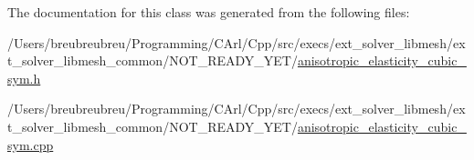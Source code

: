 The documentation for this class was generated from the following files\+:\begin{DoxyCompactItemize}
\item 
/\+Users/breubreubreu/\+Programming/\+C\+Arl/\+Cpp/src/execs/ext\+\_\+solver\+\_\+libmesh/ext\+\_\+solver\+\_\+libmesh\+\_\+common/\+N\+O\+T\+\_\+\+R\+E\+A\+D\+Y\+\_\+\+Y\+E\+T/\hyperlink{anisotropic__elasticity__cubic__sym_8h}{anisotropic\+\_\+elasticity\+\_\+cubic\+\_\+sym.\+h}\item 
/\+Users/breubreubreu/\+Programming/\+C\+Arl/\+Cpp/src/execs/ext\+\_\+solver\+\_\+libmesh/ext\+\_\+solver\+\_\+libmesh\+\_\+common/\+N\+O\+T\+\_\+\+R\+E\+A\+D\+Y\+\_\+\+Y\+E\+T/\hyperlink{anisotropic__elasticity__cubic__sym_8cpp}{anisotropic\+\_\+elasticity\+\_\+cubic\+\_\+sym.\+cpp}\end{DoxyCompactItemize}
